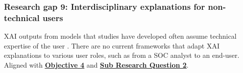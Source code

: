 
\subsubsection*{Research gap 9: Interdisciplinary explanations for non-technical users}\label{research-gap-9}
XAI outputs from models that studies have developed often assume technical expertise of the user \citep{greco2023explaining}. There are no current frameworks that adapt XAI explanations to various user roles, such as from a SOC analyst to an end-user. Aligned with \hyperref[objective-4]{\uline{\textbf{Objective 4}}} and \hyperref[sub-research-q2]{\uline{\textbf{Sub Research Question 2}}}.

